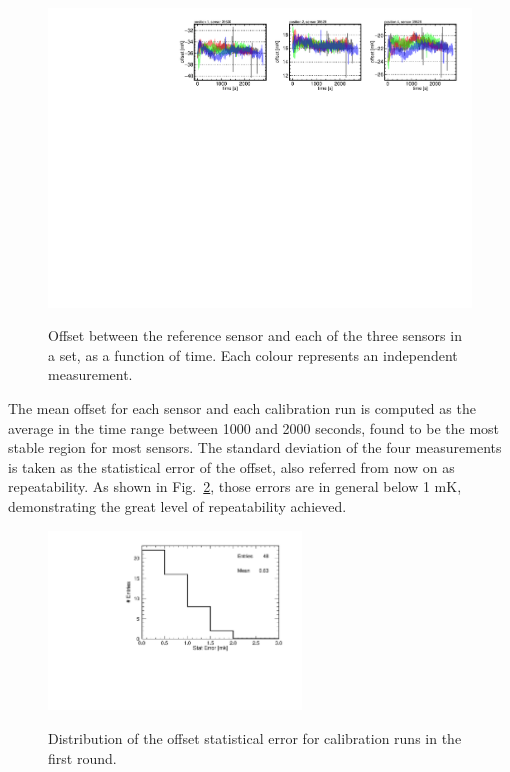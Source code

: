 \label{sec:results_first_round}
\begin{figure}[htbp]
\centering
{\includegraphics[width=\textwidth]{images/figure_9.pdf}}
\caption{Offset between the reference sensor and each of the three sensors in a set, as a function of time. Each colour represents an independent measurement.}
\label{fi:CAL_offset_example}
\end{figure}

The mean offset for each sensor and each calibration run is computed as the average in the time range between 1000 and 2000 seconds, found to be the most stable region for most sensors. The standard deviation of the four measurements is taken as the statistical error of the offset, also referred from now on as repeatability. As shown in Fig.~\ref{fi:CAL_rms_1r}, those errors are in general below 1 mK, demonstrating the great level of repeatability achieved. 

\begin{figure}[htbp]
\centering
{\includegraphics[width=0.6\textwidth]{images/figure_10.pdf}}
\caption{Distribution of the offset statistical error for calibration runs in the first round.}
\label{fi:CAL_rms_1r}
\end{figure}

